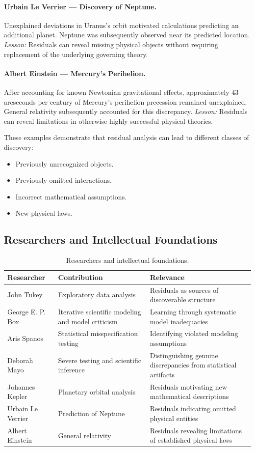 \paragraph{Urbain Le Verrier --- Discovery of Neptune.}
Unexplained deviations in Uranus's orbit motivated calculations predicting an additional planet.
Neptune was subsequently observed near its predicted location.
\textit{Lesson:} Residuals can reveal missing physical objects without requiring replacement of the underlying governing theory.

\paragraph{Albert Einstein --- Mercury's Perihelion.}
After accounting for known Newtonian gravitational effects, approximately 43 arcseconds per century of Mercury's perihelion precession remained unexplained.
General relativity subsequently accounted for this discrepancy.
\textit{Lesson:} Residuals can reveal limitations in otherwise highly successful physical theories.

These examples demonstrate that residual analysis can lead to different classes of discovery:
\begin{itemize}\setlength\itemsep{0pt}
\item Previously unrecognized objects.
\item Previously omitted interactions.
\item Incorrect mathematical assumptions.
\item New physical laws.
\end{itemize}
\subsection{Researchers and Intellectual Foundations}
\begin{table}[tbp]\centering\footnotesize\caption{Researchers and intellectual foundations.}\label{tab:researchers}\begin{tabular}{@{}p{}p{}p{}@{}}\toprule
\textbf{Researcher} & \textbf{Contribution} & \textbf{Relevance}\\\midrule
John Tukey & Exploratory data analysis & Residuals as sources of discoverable structure\\
George E. P. Box & Iterative scientific modeling and model criticism & Learning through systematic model inadequacies\\
Aris Spanos & Statistical misspecification testing & Identifying violated modeling assumptions\\
Deborah Mayo & Severe testing and scientific inference & Distinguishing genuine discrepancies from statistical artifacts\\
Johannes Kepler & Planetary orbital analysis & Residuals motivating new mathematical descriptions\\
Urbain Le Verrier & Prediction of Neptune & Residuals indicating omitted physical entities\\
Albert Einstein & General relativity & Residuals revealing limitations of established physical laws\\
\bottomrule\end{tabular}\end{table}
